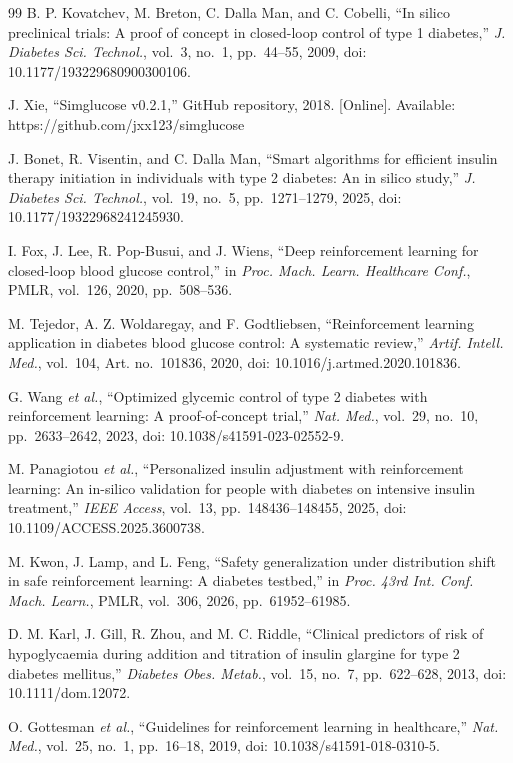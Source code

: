 \documentclass[conference]{IEEEtran}
\begin{document}
\begin{thebibliography}{99}
 B. P. Kovatchev, M. Breton, C. Dalla Man, and C. Cobelli, ``In silico
preclinical trials: A proof of concept in closed-loop control of type 1 diabetes,'' \emph{J.
Diabetes Sci. Technol.}, vol.~3, no.~1, pp.~44--55, 2009, doi: 10.1177/193229680900300106.

 J. Xie, ``Simglucose v0.2.1,'' GitHub repository, 2018. [Online].
Available: https://github.com/jxx123/simglucose

 J. Bonet, R. Visentin, and C. Dalla Man, ``Smart algorithms for efficient
insulin therapy initiation in individuals with type 2 diabetes: An in silico study,'' \emph{J.
Diabetes Sci. Technol.}, vol.~19, no.~5, pp.~1271--1279, 2025, doi: 10.1177/19322968241245930.

 I. Fox, J. Lee, R. Pop-Busui, and J. Wiens, ``Deep reinforcement learning for
closed-loop blood glucose control,'' in \emph{Proc. Mach. Learn. Healthcare Conf.}, PMLR,
vol.~126, 2020, pp.~508--536.

 M. Tejedor, A. Z. Woldaregay, and F. Godtliebsen, ``Reinforcement
learning application in diabetes blood glucose control: A systematic review,'' \emph{Artif.
Intell. Med.}, vol.~104, Art. no.~101836, 2020, doi: 10.1016/j.artmed.2020.101836.

 G. Wang \emph{et al.}, ``Optimized glycemic control of type 2 diabetes with
reinforcement learning: A proof-of-concept trial,'' \emph{Nat. Med.}, vol.~29, no.~10,
pp.~2633--2642, 2023, doi: 10.1038/s41591-023-02552-9.

 M. Panagiotou \emph{et al.}, ``Personalized insulin adjustment with
reinforcement learning: An in-silico validation for people with diabetes on intensive insulin
treatment,'' \emph{IEEE Access}, vol.~13, pp.~148436--148455, 2025, doi:
10.1109/ACCESS.2025.3600738.

 M. Kwon, J. Lamp, and L. Feng, ``Safety generalization under distribution
shift in safe reinforcement learning: A diabetes testbed,'' in \emph{Proc. 43rd Int. Conf. Mach.
Learn.}, PMLR, vol.~306, 2026, pp.~61952--61985.

 D. M. Karl, J. Gill, R. Zhou, and M. C. Riddle, ``Clinical predictors of
risk of hypoglycaemia during addition and titration of insulin glargine for type 2 diabetes
mellitus,'' \emph{Diabetes Obes. Metab.}, vol.~15, no.~7, pp.~622--628, 2013, doi:
10.1111/dom.12072.

 O. Gottesman \emph{et al.}, ``Guidelines for reinforcement learning in
healthcare,'' \emph{Nat. Med.}, vol.~25, no.~1, pp.~16--18, 2019, doi:
10.1038/s41591-018-0310-5.


\end{thebibliography}
\end{document}
